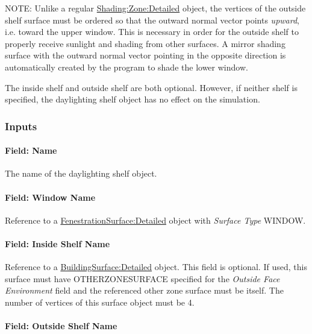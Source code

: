 \begin{callout}
  NOTE: Unlike a regular \hyperref[shadingzonedetailed-000]{Shading:Zone:Detailed} object, the vertices of the outside shelf surface must be ordered so that the outward normal vector points \emph{upward}, i.e. toward the upper window. This is necessary in order for the outside shelf to properly receive sunlight and shading from other surfaces. A mirror shading surface with the outward normal vector pointing in the opposite direction is automatically created by the program to shade the lower window.
\end{callout}

The inside shelf and outside shelf are both optional. However, if neither shelf is specified, the daylighting shelf object has no effect on the simulation.

\subsubsection{Inputs}\label{inputs-7-005}

\paragraph{Field: Name}\label{field-name-4-006}

The name of the daylighting shelf object.

\paragraph{Field: Window Name}\label{field-window-name-1}

Reference to a \hyperref[fenestrationsurfacedetailed]{FenestrationSurface:Detailed} object with \emph{Surface Type} WINDOW.

\paragraph{Field: Inside Shelf Name}\label{field-inside-shelf-name}

Reference to a \hyperref[buildingsurfacedetailed]{BuildingSurface:Detailed} object. This field is optional. If used, this surface must have OTHERZONESURFACE specified for the \emph{Outside Face Environment} field and the referenced other zone surface must be itself. The number of vertices of this surface object must be 4.

\paragraph{Field: Outside Shelf Name}\label{field-outside-shelf-name}

